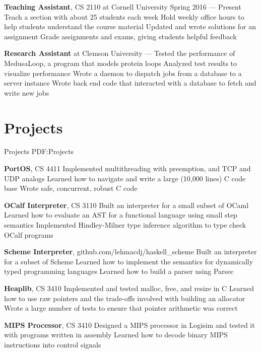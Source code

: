 \documentclass[letterpaper,10pt,oneside]{simpleresume}
\begin{document}
\begin{minipage}[t][0pt]{\linewidth}
\begin{body}
\textbf{Teaching Assistant}, CS 2110 at Cornell University
\hfill
Spring 2016 --- Present
\BulletItem%
Teach a section with about 25 students each week
\BulletItem%
Hold weekly office hours to help students understand the course material
\BulletItem%
Updated and wrote solutions for an assignment
\BulletItem%
Grade assignments and exams, giving students helpful feedback

\textbf{Research Assistant} at Clemson University
\hfill
{} --- 
\BulletItem%
Tested the performance of MedusaLoop, a program that models protein loops
\BulletItem%
Analyzed test results to visualize performance
\BulletItem%
Wrote a daemon to dispatch jobs from a database to a server instance
\BulletItem%
Wrote back end code that interacted with a database to fetch and write new jobs

\section%
{Projects}
{Projects}
{PDF:Projects}

\textbf{PortOS}, CS 4411
\BulletItem%
Implemented multithreading with preemption, and TCP and UDP analogs
\BulletItem%
Learned how to navigate and write a large (10,000 lines) C code base
\BulletItem%
Wrote safe, concurrent, robust C code
\GapNoBreak%

\textbf{OCalf Interpreter}, CS 3110
\BulletItem%
Built an interpreter for a small subset of OCaml
\BulletItem%
Learned how to evaluate an AST for a functional language using small step
semantics
\BulletItem%
Implemented Hindley-Milner type inference algorithm to type check OCalf programs
\GapNoBreak%

\textbf{Scheme Interpreter}, github.com/lehmacdj/haskell\_scheme
\BulletItem%
Built an interpreter for a subset of Scheme
\BulletItem%
Learned how to implement the semantics for dynamically typed programming
languages
\BulletItem%
Learned how to build a parser using Parsec
\GapNoBreak%

\textbf{Heaplib}, CS 3410
\BulletItem%
Implemented and tested malloc, free, and resize in C
\BulletItem%
Learned how to use raw pointers and the trade-offs involved with building
an allocator
\BulletItem%
Wrote a large number of tests to ensure that pointer arithmetic was correct
\GapNoBreak%

\textbf{MIPS Processor}, CS 3410
\BulletItem%
Designed a MIPS processor in Logisim and tested it with programs written in
assembly
\BulletItem%
Learned how to decode binary MIPS instructions into control signals
\GapNoBreak%


\end{body}
\end{minipage}
\end{document}
